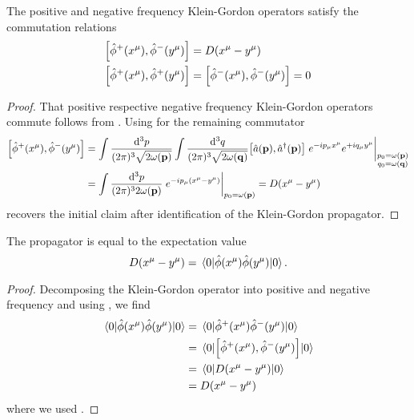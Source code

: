 \begin{lemma}\label{thm:qkg_comm_pn}
	The positive and negative frequency Klein-Gordon operators satisfy the commutation relations
	\begin{align}
		\comm{\hat\phi^+(x^\mu)}{\hat\phi^-(y^\mu)}
		&=
		D(x^\mu-y^\mu)
		\\
		\comm{\hat\phi^+(x^\mu)}{\hat\phi^+(y^\mu)}
		&=
		\comm{\hat\phi^-(x^\mu)}{\hat\phi^-(y^\mu)}
		=
		0
	\end{align}
\end{lemma}
\begin{proof}
	That positive respective negative frequency Klein-Gordon operators commute follows from .
	Using  for the remaining commutator
	\begin{equation*}
		\begin{split}
			\comm{\hat\phi^+(x^\mu)}{\hat\phi^-(y^\mu)}
			&=
			\int\frac{\dd[3]{p}}{(2\pi)^3\sqrt{2\omega(\vb{p})}}
			\int\frac{\dd[3]{q}}{(2\pi)^3\sqrt{2\omega(\vb{q})}}
			\comm{\hat{a}(\vb{p})}{\hat{a}^\dagger(\vb{p})}
			\eval{
				e^{-ip_\mu x^\mu}
				e^{+iq_\mu y^\mu}
			}_{\substack{p_0=\omega(\vb{p})\\q_0=\omega(\vb{q})}}
			\\
			&=
			\int\frac{\dd[3]{p}}{(2\pi)^32\omega(\vb{p})}
			\eval{
				e^{-ip_\mu(x^\mu-y^\mu)}
			}_{p_0=\omega(\vb{p})}
			=
			D(x^\mu-y^\mu)
		\end{split}
	\end{equation*}
	recovers the initial claim after identification of the Klein-Gordon propagator.
\end{proof}

\begin{lemma}\label{thm:qkg_prop_corr}
	The propagator is equal to the expectation value
	\begin{equation}
		D(x^\mu-y^\mu)
		=
		\expval{\hat\phi(x^\mu)\hat\phi(y^\mu)}{0}
		.
	\end{equation}
\end{lemma}
\begin{proof}
	Decomposing the Klein-Gordon operator into positive and negative frequency and using , we find
	\begin{equation*}
		\begin{split}
			\expval{\hat\phi(x^\mu)\hat\phi(y^\mu)}{0}
			&=
			\expval{\hat\phi^+(x^\mu)\hat\phi^-(y^\mu)}{0}
			\\
			&=
			\expval{\comm{\hat\phi^+(x^\mu)}{\hat\phi^-(y^\mu)}}{0}
			\\
			&=
			\expval{D(x^\mu-y^\mu)}{0}
			\\
			&=
			D(x^\mu-y^\mu)
		\end{split}
	\end{equation*}
	where we used .
\end{proof}

